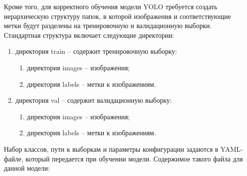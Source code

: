 Кроме того, для корректного обучения модели YOLO требуется создать иерархическую 
структуру папок, в которой изображения и соответствующие метки будут разделены на 
тренировочную и валидационную выборки. Стандартная структура включает следующие 
директории:

\begin{enumerate}
    \item директория train -- содержит тренировочную выборку:
    \begin{enumerate}
        \item директория images -- изображения;
        \item директория labels -- метки к изображениям.
    \end{enumerate}
    \item директория val -- содержит валидационную выборку:
    \begin{enumerate}
        \item директория images -- изображения;
        \item директория labels -- метки к изображениям.
    \end{enumerate}
\end{enumerate}

Набор классов, пути к выборкам и параметры конфигурации задаются в YAML-файле, 
который передается при обучении модели. Содержимое такого файла для данной 
модели:

\begin{code}
    \vspace{-0.75cm}
    {\small
        \inputminted[mathescape,linenos,frame=lines,breaklines]{yaml}{code/imagecaptcha/train_captcha.yaml}
    }
\end{code}
\vspace{-0.4cm}
